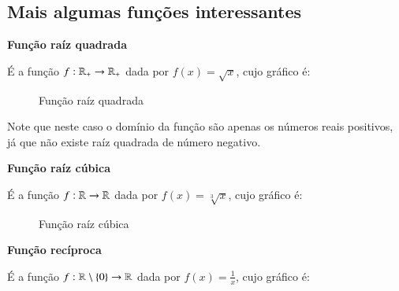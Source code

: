   \subsection{Mais algumas funções interessantes}
  
  \textbf{Função raíz quadrada}
  
  É a função $f: \mathbb{R}_{+} \to \mathbb{R}_{+}$ dada por $f(x)= \sqrt{x}$, cujo gráfico é:
  
   \begin{figure}[H]
 \centering
    \caption{Função raíz quadrada}
  \end{figure}
  
  Note que neste caso o domínio da função são apenas os números reais positivos, já que não existe raíz quadrada de número negativo.
  
  \newpage
  \textbf{Função raíz cúbica}
  
  É a função $f: \mathbb{R} \to \mathbb{R}$ dada por $f(x)= \sqrt[3]{x}$, cujo gráfico é:
  
   \begin{figure}[H]
 \centering
    \caption{Função raíz cúbica}
  \end{figure} 
  
  \textbf{Função recíproca}
  
  É a função $f: \mathbb{R} \setminus \{0\} \to \mathbb{R}$ dada por $f(x)= \frac{1}{x}$, cujo gráfico é:
  
